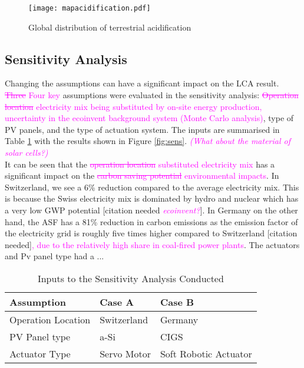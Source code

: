 \begin{figure}[H]
\begin{center}
\texttt{[image: mapacidification.pdf]}
\caption{Global distribution of terrestrial acidification}
\label{fig:mapAcid}
\end{center}
\end{figure}



\subsection{Sensitivity Analysis}

Changing the assumptions can have a significant impact on the LCA result. \textcolor{magenta}{\sout{Three} Four key} assumptions were evaluated in the sensitivity analysis: \textcolor{magenta}{\sout{Operation location} electricity mix being substituted by on-site energy production, uncertainty in the ecoinvent background system (Monte Carlo analysis)}, type of PV panels, and the type of actuation system. The inputs are summarised in Table \ref{tab:sens} with the results shown in Figure \ref{fig:sens}. \textcolor{magenta}{\textit{(What about the material of solar cells?)}} \\

It can be seen that the \textcolor{magenta}{\sout{operation location} substituted electricity mix} has a significant impact on the \textcolor{magenta}{\sout{carbon saving potential} environmental impacts}. In Switzerland, we see a 6\% reduction compared to the average electricity mix. This is because the Swiss electricity mix is dominated by hydro and nuclear which has a very low GWP potential [citation needed\textcolor{magenta}{ \textit{ecoinvent?}}]. In Germany on the other hand, the ASF has a 81\% reduction in carbon emissions as the emission factor of the electricity grid is roughly five times higher compared to Switzerland [citation needed]\textcolor{magenta}{, due to the relatively high share in coal-fired power plants}. The actuators and Pv panel type had a ...



\begin{table}
\centering
\begin{tabular}{lll}
Assumption & Case A & Case B \\
\hline
Operation Location  & Switzerland & Germany \\
PV Panel type  & a-Si        & CIGS    \\
Actuator Type           & Servo Motor       & Soft Robotic Actuator   \\
\end{tabular}
\caption{Inputs to the Sensitivity Analysis Conducted}
\label{tab:sens}
\end{table}

